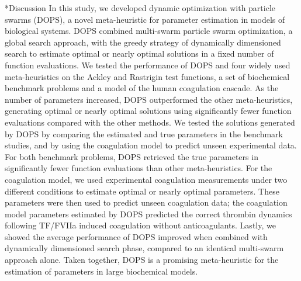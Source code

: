 \documentclass[12pt]{article}
\makeatletter
\renewcommand\section{\@startsection
	{subsection}{2}{0mm}
	{-0.2in}
	{0.05\baselineskip}
	{\normalfont\large\bfseries}}
\makeatother
\begin{document}
\section*{Discussion}
In this study, we developed dynamic optimization with particle swarms (DOPS), a novel meta-heuristic for parameter estimation in models of biological systems.
DOPS combined multi-swarm particle swarm optimization, a global search approach, with the greedy strategy of dynamically dimensioned search to estimate optimal or nearly optimal solutions in a fixed number of function evaluations. We tested the performance of DOPS and four widely used meta-heuristics on the Ackley and Rastrigin test functions, a set of biochemical benchmark problems and a model of the human coagulation cascade.
As the number of parameters increased, DOPS outperformed the other meta-heuristics, generating optimal or nearly optimal solutions using significantly fewer function evaluations compared with the other methods. We tested the solutions generated by DOPS by comparing the estimated and true parameters in the benchmark studies, and by using the coagulation model to predict unseen experimental data. For both benchmark problems, DOPS retrieved the true parameters in significantly fewer function evaluations than other meta-heuristics.
For the coagulation model, we used experimental coagulation measurements under two different conditions to estimate optimal or nearly optimal parameters.
These parameters were then used to predict unseen coagulation data;
the coagulation model parameters estimated by DOPS predicted the correct thrombin dynamics following TF/FVIIa induced coagulation without anticoagulants.
Lastly, we showed the average performance of DOPS improved when combined with dynamically dimensioned search phase, compared to an identical multi-swarm approach alone.
Taken together, DOPS is a promising meta-heuristic for the estimation of parameters in large biochemical models.

\end{document}
